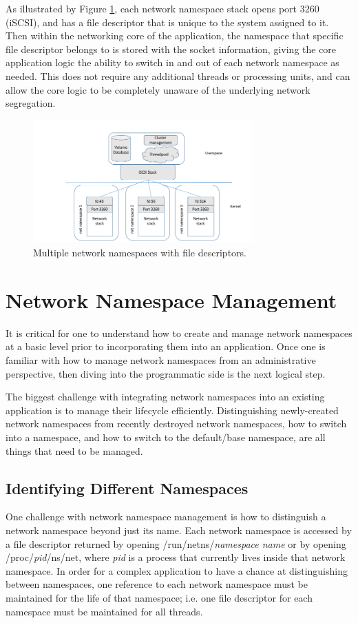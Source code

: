 \documentclass[letterpaper]{article}
\begin{document}
As illustrated by Figure \ref{namespace-fds}, each network namespace stack opens port 3260 (iSCSI), and has a file descriptor that is unique to the system assigned to it. Then within the networking core of the application, the namespace that specific file descriptor belongs to is stored with the socket information, giving the core application logic the ability to switch in and out of each network namespace as needed. This does not require any additional threads or processing units, and can allow the core logic to be completely unaware of the underlying network segregation.

\begin{figure}[h]
\includegraphics[width=3.31in]{multiple-namespaces-with-fd.png}
\caption{Multiple network namespaces with file descriptors.}
\label{namespace-fds}
\end{figure}

\section{Network Namespace Management}
It is critical for one to understand how to create and manage network namespaces at a basic level\cite{edge2014} prior to incorporating them into an application. Once one is familiar with how to manage network namespaces from an administrative perspective, then diving into the programmatic side is the next logical step\cite{man2016}.

The biggest challenge with integrating network namespaces into an existing application is to manage their lifecycle efficiently. Distinguishing newly-created network namespaces from recently destroyed network namespaces, how to switch into a namespace, and how to switch to the default/base namespace, are all things that need to be managed.

\subsection{Identifying Different Namespaces}
One challenge with network namespace management is how to distinguish a network namespace beyond just its name. Each network namespace is accessed by a file descriptor returned by opening /run/netns/\textit{namespace name} or by opening /proc/\textit{pid}/ns/net, where \textit{pid} is a process that currently lives inside that network namespace. In order for a complex application to have a chance at distinguishing between namespaces, one reference to each network namespace must be maintained for the life of that namespace; i.e. one file descriptor for each namespace must be maintained for all threads.
\end{document}
